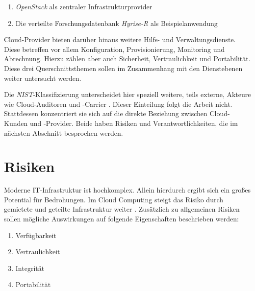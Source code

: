 \begin{enumerate}
	\item \emph{OpenStack} als zentraler Infrastrukturprovider
	\item Die verteilte Forschungsdatenbank \emph{Hyrise-R} als Beispielanwendung
\end{enumerate}

\noindent
Cloud-Provider bieten darüber hinaus weitere Hilfs- und Verwaltungsdienste. Diese betreffen vor allem Konfiguration, Provisionierung, Monitoring und Abrechnung. Hierzu zählen aber auch Sicherheit, Vertraulichkeit und Portabilität. Diese drei Querschnittsthemen sollen im Zusammenhang mit den Dienstebenen weiter untersucht werden.

Die \emph{NIST}-Klassifizierung unterscheidet hier speziell weitere, teils externe, Akteure wie Cloud-Auditoren und -Carrier \cite{nist:2011:reference-architecture}. Dieser Einteilung folgt die Arbeit nicht. Stattdessen konzentriert sie sich auf die direkte Beziehung zwischen Cloud-Kunden und -Provider. Beide haben Risiken und Verantwortlichkeiten, die im nächsten Abschnitt besprochen werden.

\section{Risiken}


Moderne IT-Infrastruktur ist hochkomplex. Allein hierdurch ergibt sich ein großes Potential für Bedrohungen. Im Cloud Computing steigt das Risiko durch gemietete und geteilte Infrastruktur weiter \cite{csa:2016:cloud-top-threats, Pearson:2010:issues-arising-cloud, 2011:takabi:security-challenges}. Zusätzlich zu allgemeinen Risiken sollen mögliche Auswirkungen auf folgende Eigenschaften beschrieben werden:

\begin{enumerate}
	\item Verfügbarkeit
	\item Vertraulichkeit
	\item Integrität
	\item Portabilität
\end{enumerate}

